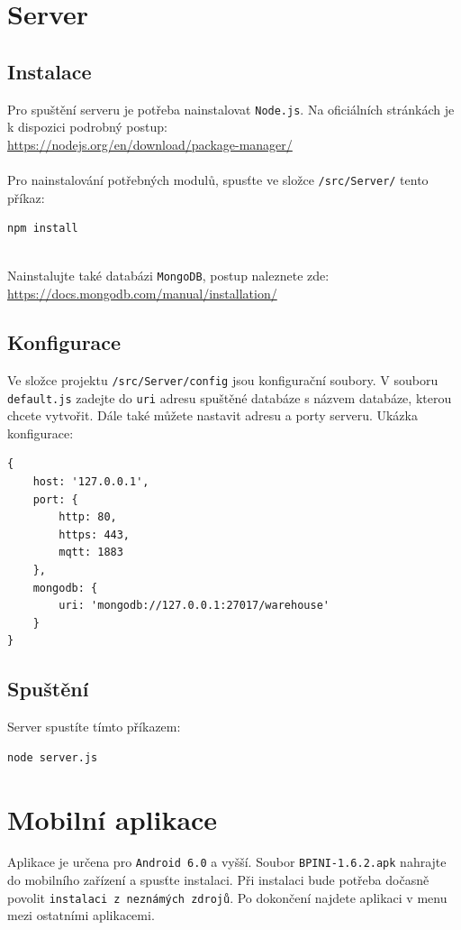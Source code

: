 \documentclass[12pt]{report}
\begin{document}
\section{Server}

\subsection{Instalace}
Pro spuštění serveru je potřeba nainstalovat \texttt{Node.js}. Na oficiálních stránkách je k dispozici podrobný postup: \\
\url{https://nodejs.org/en/download/package-manager/}
\\\\
Pro nainstalování potřebných modulů, spusťte ve složce \texttt{/src/Server/} tento příkaz:
\begin{verbatim}
npm install
\end{verbatim}
\ \\
Nainstalujte také databázi \texttt{MongoDB}, postup naleznete zde: \\
\url{https://docs.mongodb.com/manual/installation/}

\subsection{Konfigurace}
Ve složce projektu \texttt{/src/Server/config} jsou konfigurační soubory. 
V souboru \texttt{default.js} zadejte do \texttt{uri} adresu spuštěné databáze s názvem databáze, kterou chcete vytvořit.
Dále také můžete nastavit adresu a porty serveru. Ukázka konfigurace:
\begin{verbatim}
{
    host: '127.0.0.1',
    port: {
        http: 80,
        https: 443,
        mqtt: 1883
    },
    mongodb: {
        uri: 'mongodb://127.0.0.1:27017/warehouse'
    }
}
\end{verbatim}



\subsection{Spuštění}
Server spustíte tímto příkazem:
\begin{verbatim}
node server.js
\end{verbatim}


\section{Mobilní aplikace}
Aplikace je určena pro \texttt{Android 6.0} a vyšší.	
Soubor \texttt{BPINI-1.6.2.apk} nahrajte do mobilního zařízení a spusťte instalaci.
Při instalaci bude potřeba dočasně povolit \texttt{instalaci z neznámých zdrojů}.
Po dokončení najdete aplikaci v menu mezi ostatními aplikacemi.
\end{document}
